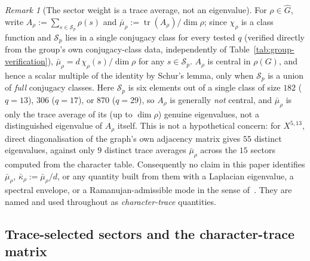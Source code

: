 \documentclass[11pt,a4paper]{article}
\theoremstyle{plain}
\theoremstyle{definition}
\theoremstyle{remark}
\newtheorem{remark}[theorem]{Remark}
\newcommand{\kap}{\bar\kappa_\rho}
\newcommand{\mubar}{\bar\mu_\rho}
\DeclareMathOperator{\tr}{tr}
\begin{document}
      \begin{remark}[The sector weight is a trace average, not an eigenvalue]
        \label{rem:trace-not-eigenvalue}
        For $\rho \in \widehat G$, write $A_\rho := \sum_{s \in \mathcal S_p} \rho(s)$ and
        $\mubar := \tr(A_\rho)/\dim\rho$; since $\chi_\rho$ is a class function and $\mathcal S_p$
        lies in a single conjugacy class for every tested $q$ (verified directly from the group's
        own conjugacy-class data, independently of Table~\ref{tab:group-verification}), $\mubar =
        d\,\chi_\rho(s)/\dim\rho$ for any $s \in \mathcal S_p$.
        $A_\rho$ is central in $\rho(G)$, and hence a scalar multiple of the identity by Schur's
        lemma, only when $\mathcal S_p$ is a union of \emph{full} conjugacy classes.
        Here $\mathcal S_p$ is six elements out of a single class of size $182$ ($q=13$), $306$
        ($q=17$), or $870$ ($q=29$), so $A_\rho$ is generally \emph{not} central, and
        $\mubar$ is only the trace average of its (up to $\dim\rho$) genuine eigenvalues, not a
        distinguished eigenvalue of $A_\rho$ itself.
        This is not a hypothetical concern: for $X^{5,13}$, direct diagonalisation of the graph's own
        adjacency matrix gives $55$ distinct eigenvalues, against only $9$ distinct trace averages
        $\mubar$ across the $15$ sectors computed from the character table.
        Consequently no claim in this paper identifies $\mubar$, $\kap := \mubar/d$, or any quantity
        built from them with a Laplacian eigenvalue, a spectral envelope, or a Ramanujan-admissible
        mode in the sense of~\cite{Beau2026a1}.
        They are named and used throughout as \emph{character-trace} quantities.
      \end{remark}

    \subsection{Trace-selected sectors and the character-trace matrix}
      \label{subsec:admissible-sectors}
\end{document}
